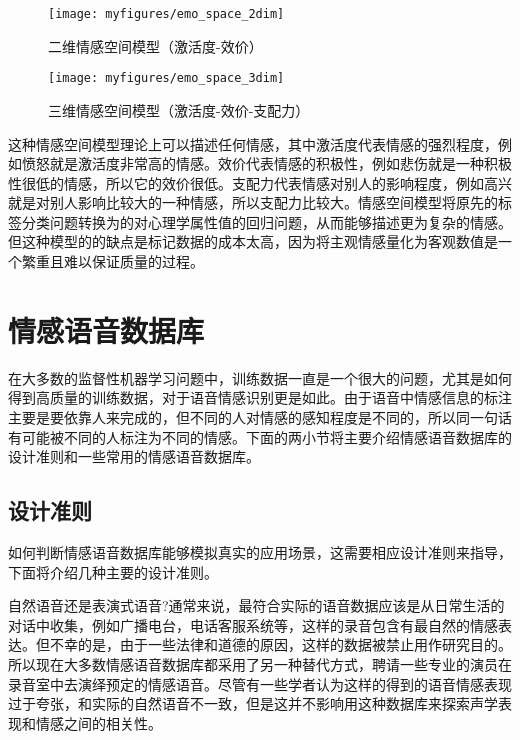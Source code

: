 \begin{figure}[htb] %
    \centering
    \texttt{[image: myfigures/emo\_space\_2dim]}
    \caption{二维情感空间模型（激活度-效价）}
    \label{fig:emo_space_2dim}
\end{figure}

\begin{figure}[htb] %
    \centering
    \texttt{[image: myfigures/emo\_space\_3dim]}
    \caption{三维情感空间模型（激活度-效价-支配力）}
    \label{fig:emo_space_3dim}
\end{figure}

这种情感空间模型理论上可以描述任何情感，其中激活度代表情感的强烈程度，例如愤怒就是激活度非常高的情感。效价代表情感的积极性，例如悲伤就是一种积极性很低的情感，所以它的效价很低。支配力代表情感对别人的影响程度，例如高兴就是对别人影响比较大的一种情感，所以支配力比较大。情感空间模型将原先的标签分类问题转换为的对心理学属性值的回归问题，从而能够描述更为复杂的情感。但这种模型的的缺点是标记数据的成本太高，因为将主观情感量化为客观数值是一个繁重且难以保证质量的过程。

\section{情感语音数据库}
\label{sec:emo_speech_database}
在大多数的监督性机器学习问题中，训练数据一直是一个很大的问题，尤其是如何得到高质量的训练数据，对于语音情感识别更是如此。由于语音中情感信息的标注主要是要依靠人来完成的，但不同的人对情感的感知程度是不同的，所以同一句话有可能被不同的人标注为不同的情感。下面的两小节将主要介绍情感语音数据库的设计准则和一些常用的情感语音数据库。

\subsection{设计准则}
\label{ssec:design_criteria}
如何判断情感语音数据库能够模拟真实的应用场景，这需要相应设计准则来指导，下面将介绍几种主要的设计准则。

自然语音还是表演式语音?通常来说，最符合实际的语音数据应该是从日常生活的对话中收集，例如广播电台，电话客服系统等，这样的录音包含有最自然的情感表达。但不幸的是，由于一些法律和道德的原因，这样的数据被禁止用作研究目的。所以现在大多数情感语音数据库都采用了另一种替代方式，聘请一些专业的演员在录音室中去演绎预定的情感语音。尽管有一些学者认为这样的得到的语音情感表现过于夸张，和实际的自然语音不一致，但是这并不影响用这种数据库来探索声学表现和情感之间的相关性。

